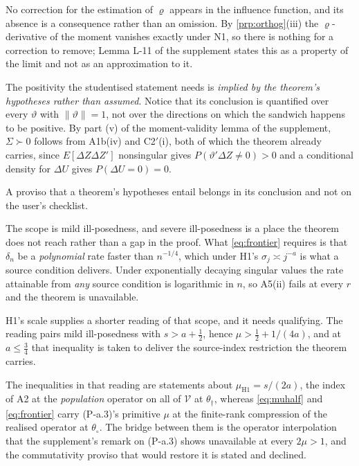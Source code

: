 \documentclass[
  12pt]{article}
\newcommand{\1}[1]{\mathds{1}\left[#1\right]}
\theoremstyle{plain}
\theoremstyle{definition}
\theoremstyle{definition}
\theoremstyle{remark}
\begin{document}
No correction for the estimation of \(\varrho\) appears in the influence
function, and its absence is a consequence rather than an omission. By
\cref{prp:orthog}(iii) the \(\varrho\)-derivative of the moment vanishes
exactly under N1, so there is nothing for a correction to remove; Lemma
L-11 of the supplement states this as a property of the limit and not as
an approximation to it.

The positivity the studentised statement needs is \emph{implied by the
theorem's hypotheses rather than assumed}. Notice that its conclusion is
quantified over every \(\vartheta\) with \(\|\vartheta\|=1\), not over
the directions on which the sandwich happens to be positive. By part (v)
of the moment-validity lemma of the supplement, \(\Sigma\succ0\) follows
from A1b(iv) and C2\('\)(i), both of which the theorem already carries,
since \(E[\Delta Z\Delta Z']\) nonsingular gives
\(P(\vartheta'\Delta Z\ne0)>0\) and a conditional density for
\(\Delta U\) gives \(P(\Delta U=0)=0\).

A proviso that a theorem's hypotheses entail belongs in its conclusion
and not on the user's checklist.

The scope is mild ill-posedness, and severe ill-posedness is a place the
theorem does not reach rather than a gap in the proof. What
\eqref{eq:frontier} requires is that \(\delta_n\) be a \emph{polynomial}
rate faster than \(n^{-1/4}\), which under H1's
\(\sigma_j\asymp j^{-a}\) is what a source condition delivers. Under
exponentially decaying singular values the rate attainable from
\emph{any} source condition is logarithmic in \(n\), so A5(ii) fails at
every \(r\) and the theorem is unavailable.

H1's scale supplies a shorter reading of that scope, and it needs
qualifying. The reading pairs mild ill-posedness with \(s>a+\tfrac12\),
hence \(\mu>\tfrac12+1/(4a)\), and at \(a\le\tfrac34\) that inequality
is taken to deliver the source-index restriction the theorem carries.

The inequalities in that reading are statements about
\(\mu_{\text{H1}}=s/(2a)\), the index of A2 at the \emph{population}
operator on all of \(\mathcal V\) at \(\theta_\dagger\), whereas
\eqref{eq:muhalf} and \eqref{eq:frontier} carry (P-a.3)'s primitive
\(\mu\) at the finite-rank compression of the realised operator at
\(\theta_\circ\). The bridge between them is the operator interpolation
that the supplement's remark on (P-a.3) shows unavailable at every
\(2\mu>1\), and the commutativity proviso that would restore it is
stated and declined.
\end{document}
